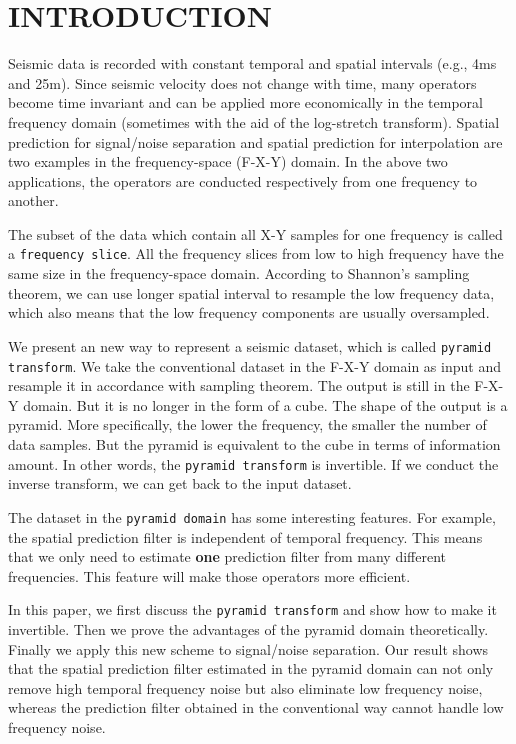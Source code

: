 \section{INTRODUCTION}
\par
Seismic data is recorded with constant temporal and spatial 
intervals (e.g., 4ms and 25m). Since seismic velocity does not change with time,
many operators become time invariant and can be applied more economically in 
the temporal frequency domain (sometimes with the aid of the log-stretch 
transform). 
Spatial prediction for signal/noise separation \cite[]{SEG-1984-S10.1} and
spatial prediction for interpolation \cite[]{GEO56-06-07850794} are two 
examples in the frequency-space (F-X-Y) domain. In the above two applications, 
the operators are conducted respectively from one frequency to another.
\par
The subset of the data which contain all X-Y samples for one frequency is
called a {\tt frequency slice}.  
All the frequency slices from low to high frequency have the same size in 
the frequency-space domain.  
According to Shannon's sampling theorem, we can use longer spatial interval 
to resample the low frequency data, which also means that the low frequency 
components are usually oversampled.
\par
We present an new way to represent a seismic dataset, which is 
called {\tt pyramid transform}. We take the conventional dataset in the F-X-Y 
domain as input and resample it in accordance with sampling theorem. The 
output is still in the F-X-Y domain. But it is no longer in the form of a cube.
The shape of the output is a pyramid. More specifically, the lower 
the frequency, the smaller the number of data samples. But the pyramid is  
equivalent to the cube in terms of information amount. In other words, the 
{\tt pyramid transform} is invertible. If we conduct the inverse transform, 
we can get back to the input dataset.
\par 
The dataset in the {\tt pyramid domain} has some interesting features. 
For example, the spatial prediction filter is independent of 
temporal frequency. This means that we only need to estimate {\bf one} 
prediction filter from many different frequencies. This feature will make 
those operators more efficient.
\par
In this paper, we first discuss the {\tt pyramid transform} and show how to 
make it invertible. Then we prove the advantages of the pyramid domain 
theoretically. Finally we apply this new scheme to signal/noise separation. 
Our result shows that the spatial prediction filter estimated in the pyramid 
domain can not only remove high temporal frequency noise but also eliminate 
low frequency noise, whereas the prediction filter obtained in the conventional
 way cannot handle low frequency noise. 

